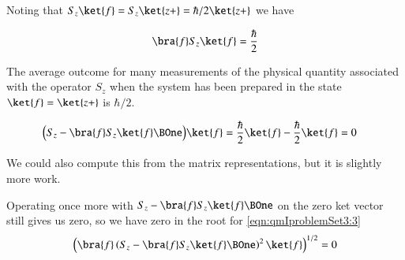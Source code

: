 
Noting that $S_z \ket{f} = S_z \ket{z+} = \hbar/2 \ket{z+}$ we have

\begin{align}\label{eqn:qmIproblemSet3:10}
\bra{f} S_z \ket{f} = \frac{\hbar}{2} 
\end{align}

The average outcome for many measurements of the physical quantity associated with the operator $S_z$ when the system has been prepared in the state $\ket{f} = \ket{z+}$ is $\hbar/2$.

\begin{align}\label{eqn:qmIproblemSet3:11}
\Bigl(S_z - \bra{f} S_z \ket{f} \BOne \Bigr) \ket{f}
&= 
\frac{\hbar}{2} \ket{f} 
-\frac{\hbar}{2} \ket{f} = 0
\end{align}

We could also compute this from the matrix representations, but it is slightly more work.

Operating once more with $S_z - \bra{f} S_z \ket{f} \BOne$ on the zero ket vector still gives us zero, so we have zero in the root for \ref{eqn:qmIproblemSet3:3}
\begin{align}\label{eqn:qmIproblemSet3:3b}
\left(\bra{f} \left( S_z - \bra{f} S_z \ket{f} \BOne \right)^2 \ket{f} \right)^{1/2} = 0
\end{align}



